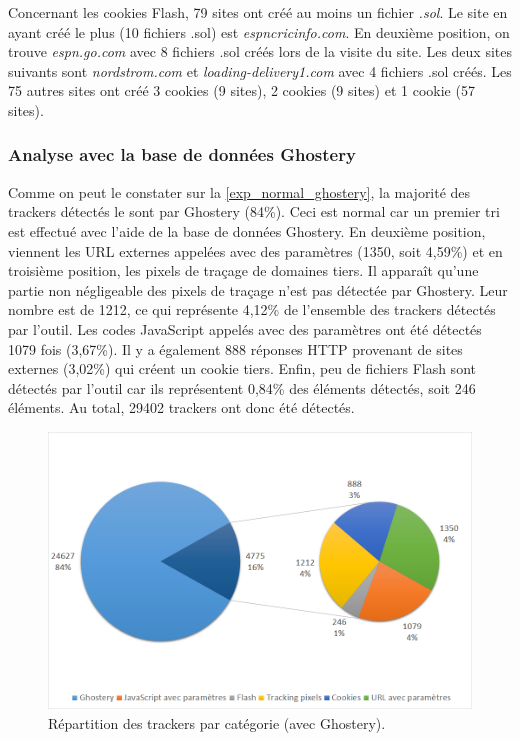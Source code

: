 Concernant les cookies Flash, 79 sites ont créé au moins un fichier \textit{.sol}. Le site en ayant créé le plus (10 fichiers .sol) est \textit{espncricinfo.com}. En deuxième position, on trouve \textit{espn.go.com} avec 8 fichiers .sol créés lors de la visite du site. Les deux sites suivants sont \textit{nordstrom.com} et \textit{loading-delivery1.com} avec 4 fichiers .sol créés. Les 75 autres sites ont créé 3 cookies (9 sites), 2 cookies (9 sites) et 1 cookie (57 sites).

\subsubsection{Analyse avec la base de données Ghostery}
Comme on peut le constater sur la \autoref{exp_normal_ghostery}, la majorité des trackers détectés le sont par Ghostery (84\%). Ceci est normal car un premier tri est effectué avec l'aide de la base de données Ghostery. En deuxième position, viennent les URL externes appelées avec des paramètres (1350, soit 4,59\%) et en troisième position, les pixels de traçage de domaines tiers. Il apparaît qu'une partie non négligeable des pixels de traçage n'est pas détectée par Ghostery. Leur nombre est de 1212, ce qui représente 4,12\% de l'ensemble des trackers détectés par l'outil. Les codes JavaScript appelés avec des paramètres ont été détectés 1079 fois (3,67\%). Il y a également 888 réponses HTTP provenant de sites externes (3,02\%) qui créent un cookie tiers. Enfin, peu de fichiers Flash sont détectés par l'outil car ils représentent 0,84\% des éléments détectés, soit 246 éléments. Au total, 29402 trackers ont donc été détectés.

\begin{figure}[!h]
	\centering
	\includegraphics[scale=.6]{resultats/ANALYSES/Images/Normal-Ghostery.png}
	\caption{\label{exp_normal_ghostery}Répartition des trackers par catégorie (avec Ghostery).}
\end{figure}

